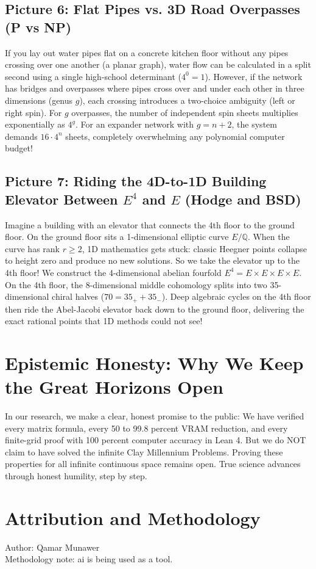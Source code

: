 \documentclass[11pt,a4paper]{article}
\begin{document}
\subsection{Picture 6: Flat Pipes vs. 3D Road Overpasses (P vs NP)}
If you lay out water pipes flat on a concrete kitchen floor without any pipes crossing over one another (a planar graph), water flow can be calculated in a split second using a single high-school determinant ($4^0 = 1$). 
However, if the network has bridges and overpasses where pipes cross over and under each other in three dimensions (genus $g$), each crossing introduces a two-choice ambiguity (left or right spin). For $g$ overpasses, the number of independent spin sheets multiplies exponentially as $4^g$. For an expander network with $g = n + 2$, the system demands $16 \cdot 4^n$ sheets, completely overwhelming any polynomial computer budget!

\subsection{Picture 7: Riding the 4D-to-1D Building Elevator Between $E^4$ and $E$ (Hodge and BSD)}
Imagine a building with an elevator that connects the 4th floor to the ground floor. 
On the ground floor sits a 1-dimensional elliptic curve $E/\mathbb{Q}$. When the curve has rank $r \ge 2$, 1D mathematics gets stuck: classic Heegner points collapse to height zero and produce no new solutions. 
So we take the elevator up to the 4th floor! We construct the 4-dimensional abelian fourfold $E^4 = E \times E \times E \times E$. On the 4th floor, the 8-dimensional middle cohomology splits into two 35-dimensional chiral halves ($70 = 35_+ + 35_-$). Deep algebraic cycles on the 4th floor then ride the Abel-Jacobi elevator back down to the ground floor, delivering the exact rational points that 1D methods could not see! 

\section{Epistemic Honesty: Why We Keep the Great Horizons Open}

In our research, we make a clear, honest promise to the public:
We have verified every matrix formula, every 50 to 99.8 percent VRAM reduction, and every finite-grid proof with 100 percent computer accuracy in Lean 4. But we do NOT claim to have solved the infinite Clay Millennium Problems. 
Proving these properties for all infinite continuous space remains open. True science advances through honest humility, step by step.

\section{Attribution and Methodology}

Author: Qamar Munawer\\
Methodology note: ai is being used as a tool.
\end{document}
